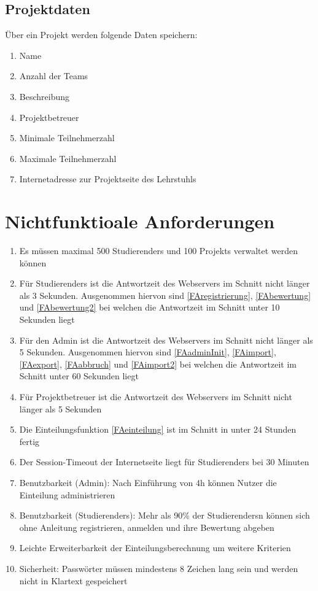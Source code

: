 \documentclass[parskip=full]{scrartcl}
\newcommand{\swtLabel}[1]{\textbf{/#1\arabic*0/}}
\begin{document}
\subsection{Projektdaten}
Über ein \gls{Projekt} werden folgende Daten speichern:
\begin{enumerate}[label=\swtLabel{D},resume] 
  \item Name \label{DProjektAnfang}
  \item Anzahl der \glspl{Team}
  \item Beschreibung
  \item \gls{Projektbetreuer}
  \item Minimale Teilnehmerzahl
  \item Maximale Teilnehmerzahl
  \item Internetadresse zur \gls{Projekt}seite des Lehrstuhls \label{DProjektEnde}
\end{enumerate}



\section{Nichtfunktioale Anforderungen}

\begin{enumerate}[label=\swtLabel{NF}]
  \item Es müssen maximal 500 \glspl{Studierender} und 100 \glspl{Projekt} verwaltet werden
  können
  \item Für \glspl{Studierender} ist die Antwortzeit des Webservers im Schnitt nicht
  länger als 3 Sekunden. Ausgenommen hiervon sind \ref{FAregistrierung}, 
  \ref{FAbewertung} und \ref{FAbewertung2} bei welchen die Antwortzeit im
  Schnitt unter 10 Sekunden liegt
  \item Für den \gls{Admin} ist die Antwortzeit des Webservers im Schnitt nicht
  länger als 5 Sekunden. Ausgenommen hiervon sind \ref{FAadminInit}, \ref{FAimport},
  \ref{FAexport}, \ref{FAabbruch} und \ref{FAimport2} bei welchen die Antwortzeit im Schnitt
  unter 60 Sekunden liegt
  \item Für \gls{Projektbetreuer} ist die Antwortzeit des Webservers im Schnitt nicht
  länger als 5 Sekunden
  \item Die \gls{Einteilung}sfunktion \ref{FAeinteilung} ist im Schnitt in unter 24
  Stunden fertig
	\item Der Session-Timeout der Internetseite liegt für \glspl{Studierender} bei 30
	Minuten
	\item Benutzbarkeit (\gls{Admin}): Nach Einführung von 4h können Nutzer die
	\gls{Einteilung} administrieren
	\item Benutzbarkeit (\glspl{Studierender}): Mehr als 90\% der \glspl{Studierender}n können
	sich ohne Anleitung registrieren, anmelden und ihre \gls{Bewertung} abgeben
	\item Leichte Erweiterbarkeit der \gls{Einteilung}sberechnung um weitere Kriterien
	\item Sicherheit: Passwörter müssen mindestens 8 Zeichen lang sein und werden
	nicht in Klartext gespeichert
 

\end{enumerate}
\end{document}
